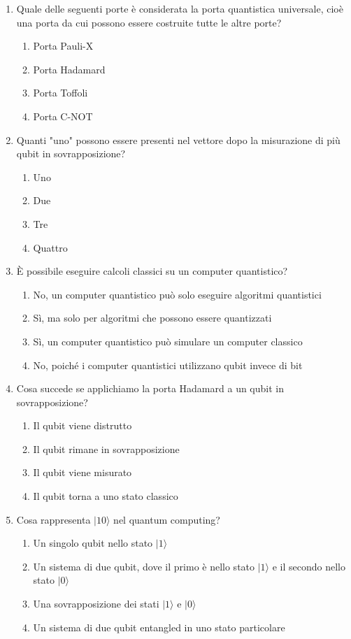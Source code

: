\documentclass[10pt]{article}
\begin{document}
\begin{enumerate}[label=\textbf{Domanda \arabic*.}]
\item Quale delle seguenti porte è considerata la porta quantistica universale, cioè una porta da cui possono essere costruite tutte le altre porte?
\begin{enumerate}[label=\Alph*.]
    \item Porta Pauli-X
    \item Porta Hadamard
    \item Porta Toffoli
    \item Porta C-NOT
\end{enumerate}


\item Quanti "uno" possono essere presenti nel vettore dopo la misurazione di più qubit in sovrapposizione?
\begin{enumerate}[label=\Alph*.]
    \item Uno
    \item Due
    \item Tre
    \item Quattro
\end{enumerate}


\item È possibile eseguire calcoli classici su un computer quantistico?
\begin{enumerate}[label=\Alph*.]

\item No, un computer quantistico può solo eseguire algoritmi quantistici
\item Sì, ma solo per algoritmi che possono essere quantizzati
\item Sì, un computer quantistico può simulare un computer classico
\item No, poiché i computer quantistici utilizzano qubit invece di bit
\end{enumerate}


\item Cosa succede se applichiamo la porta Hadamard a un qubit in sovrapposizione?
\begin{enumerate}[label=\Alph*.]
    
    \item Il qubit viene distrutto
    \item Il qubit rimane in sovrapposizione
    \item Il qubit viene misurato
    \item Il qubit torna a uno stato classico
\end{enumerate}


\item Cosa rappresenta \(|1 0\rangle\) nel quantum computing?
\begin{enumerate}[label=\Alph*.]
    \item Un singolo qubit nello stato \(|1\rangle\)
    \item Un sistema di due qubit, dove il primo è nello stato \(|1\rangle\) e il secondo nello stato \(|0\rangle\)
    \item Una sovrapposizione dei stati \(|1\rangle\) e \(|0\rangle\)
    \item Un sistema di due qubit entangled in uno stato particolare
\end{enumerate}



\end{enumerate}
\end{document}
